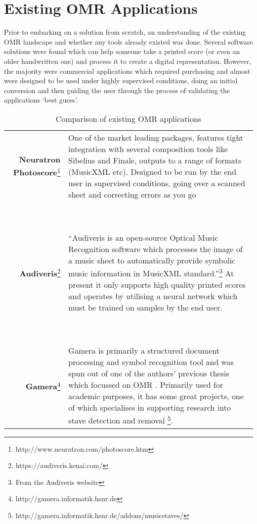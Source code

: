 \section{Existing OMR Applications}

Prior to embarking on a solution from scratch, an understanding of the existing OMR landscape and whether any tools already existed was done. Several software solutions were found which can help someone take a printed score (or even an older handwritten one) and process it to create a digital representation. However, the majority were commercial applications which required purchasing and almost were designed to be used under highly supervised conditions, doing an initial conversion and then guiding the user through the process of validating the applications `best guess'.

\begin{table}[h]
\caption{Comparison of existing OMR applications}
\begin{tabularx}{\linewidth}{ r | X }
    \textbf{Neuratron Photoscore}\footnote{http://www.neuratron.com/photoscore.htm} & One of the market leading packages, features tight integration with several composition tools like Sibelius and Finale, outputs to a range of formats (MusicXML etc). Designed to be run by the end user in supervised conditions, going over a scanned sheet and correcting errors as you go \\

    \ & \ \\
    \hline
    \ & \ \\

    \textbf{Audiveris}\footnote{https://audiveris.kenai.com/} & ``Audiveris is an open-source Optical Music Recognition software which processes the image of a music sheet to automatically provide symbolic music information in MusicXML standard.''\footnote{From the Audiveris website} \newline \newline At present it only supports high quality printed scores and operates by utilising a neural network which must be trained on samples by the end user. \\

    \ & \ \\
    \hline
    \ & \ \\

    \textbf{Gamera}\footnote{http://gamera.informatik.hsnr.de} & Gamera is primarily a structured document processing and symbol recognition tool \parencite{macmillan2002gamera} and was spun out of one of the authors' previous thesis which focussed on OMR \parencite{fujinaga1996adaptive}. Primarily used for academic purposes, it has some great projects, one of which specialises in supporting research into stave detection and removal \footnote{http://gamera.informatik.hsnr.de/addons/musicstaves/}. \\


\end{tabularx}
\end{table}
